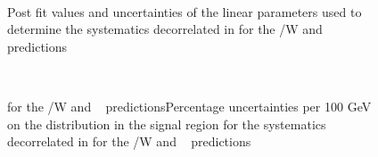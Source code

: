 \begin{figure}[h!]
  \centering
  ~~
  \\
  \caption{\label{fig:postFitPerHt} 
  Post fit values and uncertainties of the linear parameters used to determine the systematics decorrelated in \scalht for 
  the \ttbar/W and \zInv~ predictions}
\end{figure}
\begin{figure}[h!]
  \centering
  ~~
  \\
  \caption{\label{fig:uncPerNJet} 
     for the \ttbar/W and \zInv~ predictionsPercentage uncertainties per 100 GeV on the \mht distribution in the signal region for the systematics decorrelated in \njet
    for the \ttbar/W and \zInv~ predictions}
\end{figure}
